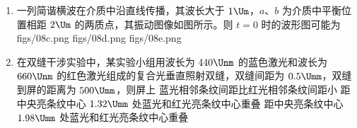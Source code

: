 \documentclass[\gkver]{gaokaozhenti}
\begin{document}
\begin{enumerate}
{CD．假设甲、乙都能完全出磁场，对甲根据动量定理有 $-B\overline{I_{1}}L\Delta t=mv_{1}-mv_{0}$，

$q_{1}=\overline{I_{1}}\Delta t=\frac{\Delta\Phi}{\Delta t}\cdot\Delta t=\frac{\Delta\Phi}{R}=\frac{B\cdot 4L^{2}}{R}$

同理对乙有 $-B\overline{I_{2}}L\Delta t'=mv_{2}-mv_{0}$，$q_{2}=\overline{I_{2}}\Delta t'=\frac{\Delta\Phi}{\Delta t'}\cdot\Delta t'=\frac{\Delta\Phi}{2R}=\frac{B\cdot 4L^{2}}{2R}$

解得 $v_{1}=0$，$v_{2}=\frac{1}{2}v_{0}=\frac{2B^{2}L^{3}}{mR}$

故甲恰好完全出磁场区域，乙完全出磁场区域时，速度大小不为 $0$；由能量守恒可知甲、乙线框从刚进磁场区域到完全出磁场区域产生的焦耳热分别为 $Q_{1}=\frac{1}{2}mv_{0}^{2}$，$Q_{2}=\frac{1}{2}mv_{0}^{2}-\frac{1}{2}m\left(\frac{v_{0}}{2}\right)^{2}=\frac{3}{8}mv_{0}^{2}$

即 $\frac{Q_{1}}{Q_{2}}=\frac{4}{3}$；

故 C 错误，D 正确。

故选 D。
}

\item
一列简谐横波在介质中沿直线传播，其波长大于 $1 \Um$，$a$、$b$ 为介质中平衡位置相距 $2 \Um$ 的两质点，其振动图像如图所示。则 $t=0$ 时的波形图可能为
\onepicture[w=3.97cm]{}
{figs/08c.png}
{figs/08d.png}
{figs/08e.png}

\item
在双缝干涉实验中，某实验小组用波长为 $440 \Unm$ 的蓝色激光和波长为 $660 \Unm$ 的红色激光组成的复合光垂直照射双缝，双缝间距为 $0.5 \Umm$，双缝到屏的距离为 $500 \Umm$，则屏上
{蓝光相邻条纹间距比红光相邻条纹间距小}
{距中央亮条纹中心 $1.32 \Umm$ 处蓝光和红光亮条纹中心重叠}
{距中央亮条纹中心 $1.98 \Umm$ 处蓝光和红光亮条纹中心重叠}
\end{enumerate}
\end{document}
